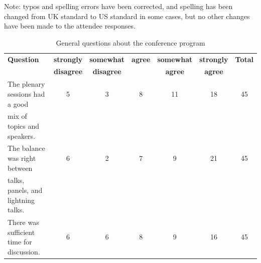 Note: typos and spelling errors have been corrected, and spelling has been changed from UK standard to US standard in some cases, but no other changes have been made to the attendee responses.



\begin{table}[h!]
\centering
\caption{General questions about the conference program}
\label{tab:survey_program}
{\scriptsize
\begin{tabular}{|l|cccccc|}
\hline
{\bf Question} &
{\bf strongly} &
{\bf somewhat}  &
{\bf agree} &
{\bf somewhat}  &
{\bf strongly}  &
{\bf Total} \\
&
{\bf disagree} &
{\bf disagree} &
&
{\bf agree} &
{\bf agree} &
\\ \hline
The plenary sessions had a good&
5 &
3 &
8 &
11 &
18 &
45 \\
\hspace{.2cm}mix of topics and speakers. &
 &
 &
 &
 &
 &
 \\
The balance was right between  &
6 &
2 &
7 &
9 &
21 &
45 \\
\hspace{.2cm}talks, panels, and lightning talks. &
&
 &
 &
 &
 &
 \\
There was sufficient time for discussion. &
6 &
6 &
8 &
9 &
16 &
45 \\
\hline
\end{tabular}
}
\end{table}

